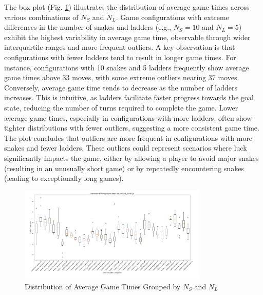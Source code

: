 The box plot (Fig. \ref{fig:boxplots}) illustrates the distribution of average game times across various combinations of $N_S$ and $N_L$. Game configurations with extreme differences in the number of snakes and ladders (e.g., $N_S = 10$ and $N_L = 5$) exhibit the highest variability in average game time, observable through wider interquartile ranges and more frequent outliers. A key observation is that configurations with fewer ladders tend to result in longer game times. For instance, configurations with 10 snakes and 5 ladders frequently show average game times above 33 moves, with some extreme outliers nearing 37 moves. Conversely, average game time tends to decrease as the number of ladders increases. This is intuitive, as ladders facilitate faster progress towards the goal state, reducing the number of turns required to complete the game. Lower average game times, especially in configurations with more ladders, often show tighter distributions with fewer outliers, suggesting a more consistent game time. The plot concludes that outliers are more frequent in configurations with more snakes and fewer ladders. These outliers could represent scenarios where luck significantly impacts the game, either by allowing a player to avoid major snakes (resulting in an unusually short game) or by repeatedly encountering snakes (leading to exceptionally long games).

\begin{figure}[th]
	\centering
	\includegraphics[width=0.8\textwidth]{"../Chapter 1/BoxPlots"}
	\caption{Distribution of Average Game Times Grouped by $N_S$ and $N_L$}
	\label{fig:boxplots}
\end{figure}

